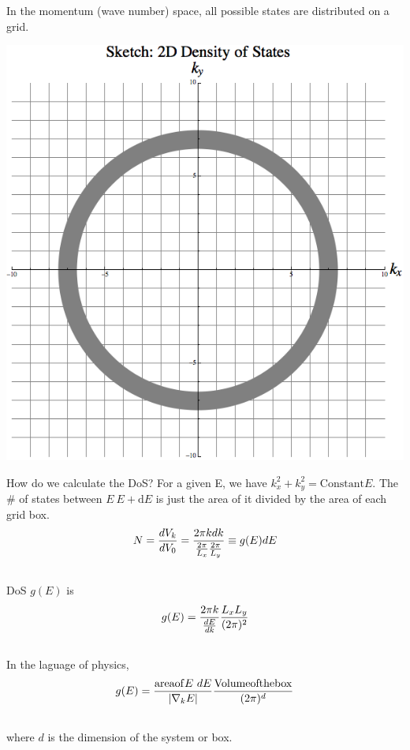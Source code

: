\documentclass[letterpaper,10pt,english]{sphinxmanual}
\begin{document}
In the momentum (wave number) space, all possible states are distributed on a grid.

{\hfill\includegraphics{2DDos.png}\hfill}

How do we calculate the DoS? For a given E, we have $k_x^2 + k_y^2 = \mathrm{Constant} E$. The \# of states between $E ~ E + \mathrm d E$ is just the area of it divided by the area of each grid box.
\begin{gather}
\begin{split}N = \frac{d V_k}{d V_0} = \frac{2\pi k d k}{\frac{2\pi}{L_x} \frac{2\pi}{L_y} } \equiv g(E) d E\end{split}\notag\\\begin{split}\end{split}\notag
\end{gather}
DoS $g(E)$ is
\begin{gather}
\begin{split}g(E) = \frac{ 2\pi k }{\frac{d E}{d k}} \frac{L_x L_y}{(2\pi)^2}\end{split}\notag\\\begin{split}\end{split}\notag
\end{gather}
In the laguage of physics,
\begin{gather}
\begin{split}g(E) = \frac{\mathrm{area of } E ~ d E}{|\nabla_k E|} \frac{\mathrm{Volume of the box} }{(2\pi)^d}\end{split}\notag\\\begin{split}\end{split}\notag
\end{gather}
where $d$ is the dimension of the system or box.
\end{document}

